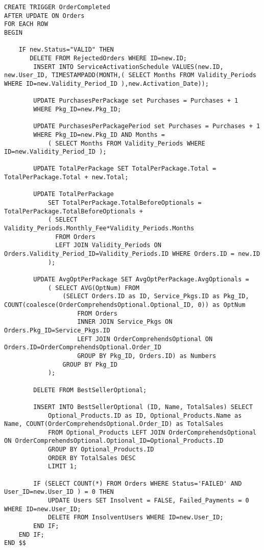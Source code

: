 \begin{lstlisting}[style=SQL]
CREATE TRIGGER OrderCompleted
AFTER UPDATE ON Orders
FOR EACH ROW
BEGIN

    IF new.Status="VALID" THEN
       DELETE FROM RejectedOrders WHERE ID=new.ID;
        INSERT INTO ServiceActivationSchedule VALUES(new.ID, new.User_ID, TIMESTAMPADD(MONTH,( SELECT Months FROM Validity_Periods WHERE ID=new.Validity_Period_ID ),new.Activation_Date));

        UPDATE PurchasesPerPackage set Purchases = Purchases + 1
        WHERE Pkg_ID=new.Pkg_ID;

        UPDATE PurchasesPerPackagePeriod set Purchases = Purchases + 1
        WHERE Pkg_ID=new.Pkg_ID AND Months =
            ( SELECT Months FROM Validity_Periods WHERE ID=new.Validity_Period_ID );

        UPDATE TotalPerPackage SET TotalPerPackage.Total = TotalPerPackage.Total + new.Total;

        UPDATE TotalPerPackage
            SET TotalPerPackage.TotalBeforeOptionals = TotalPerPackage.TotalBeforeOptionals +
            ( SELECT Validity_Periods.Monthly_Fee*Validity_Periods.Months
              FROM Orders
              LEFT JOIN Validity_Periods ON Orders.Validity_Period_ID=Validity_Periods.ID WHERE Orders.ID = new.ID
            );

        UPDATE AvgOptPerPackage SET AvgOptPerPackage.AvgOptionals =
            ( SELECT AVG(OptNum) FROM
                (SELECT Orders.ID as ID, Service_Pkgs.ID as Pkg_ID, COUNT(coalesce(OrderComprehendsOptional.Optional_ID, 0)) as OptNum
                    FROM Orders
                    INNER JOIN Service_Pkgs ON Orders.Pkg_ID=Service_Pkgs.ID
                    LEFT JOIN OrderComprehendsOptional ON Orders.ID=OrderComprehendsOptional.Order_ID
                    GROUP BY Pkg_ID, Orders.ID) as Numbers
                GROUP BY Pkg_ID
            );

        DELETE FROM BestSellerOptional;

        INSERT INTO BestSellerOptional (ID, Name, TotalSales) SELECT
            Optional_Products.ID as ID, Optional_Products.Name as Name, COUNT(OrderComprehendsOptional.Order_ID) as TotalSales
            FROM Optional_Products LEFT JOIN OrderComprehendsOptional ON OrderComprehendsOptional.Optional_ID=Optional_Products.ID
            GROUP BY Optional_Products.ID
            ORDER BY TotalSales DESC
            LIMIT 1;

        IF (SELECT COUNT(*) FROM Orders WHERE Status='FAILED' AND User_ID=new.User_ID ) = 0 THEN
            UPDATE Users SET Insolvent = FALSE, Failed_Payments = 0 WHERE ID=new.User_ID;
            DELETE FROM InsolventUsers WHERE ID=new.User_ID;
        END IF;
    END IF;
END $$

\end{lstlisting}



